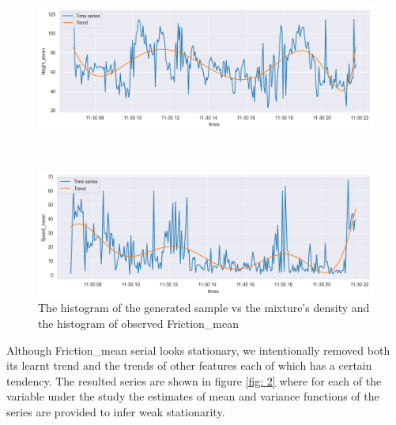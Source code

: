 \documentclass[12pt, bachelor, substylefile = algo_title.rtx]{disser}
\theoremstyle{definition}
\begin{document}
\begin{figure}[!h]
\begin{minipage}{.48\textwidth}
     \includegraphics[width=\linewidth]{trend4}
   \end{minipage}\\
\centering
\begin{minipage}{.48\textwidth}
     \includegraphics[width=\linewidth]{trend5}
   \end{minipage}
\caption{The histogram of the generated sample vs the mixture's density and the histogram of observed Friction\_mean}
\label{fig: 1}
\end{figure}

Although Friction\_mean serial looks stationary, we intentionally removed both its learnt trend and the trends of other features each of which has a certain tendency. The resulted series are shown in figure \ref{fig: 2} where for each of the variable under the study the estimates of mean and variance functions of the series are provided to infer weak stationarity.
\end{document}

